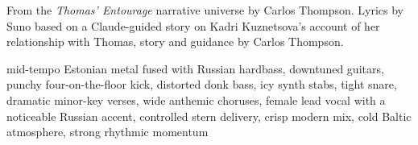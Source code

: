 
\begin{notes}
From the \emph{Thomas' Entourage} narrative universe by Carlos Thompson. Lyrics by Suno based on a Claude-guided story on Kadri Kuznetsova's account of her relationship with Thomas, story and guidance by Carlos Thompson.
\end{notes}
\begin{style}
mid-tempo Estonian metal fused with Russian hardbass, downtuned guitars, punchy four-on-the-floor kick, distorted donk bass, icy synth stabs, tight snare, dramatic minor-key verses, wide anthemic choruses, female lead vocal with a noticeable Russian accent, controlled stern delivery, crisp modern mix, cold Baltic atmosphere, strong rhythmic momentum
\end{style}
